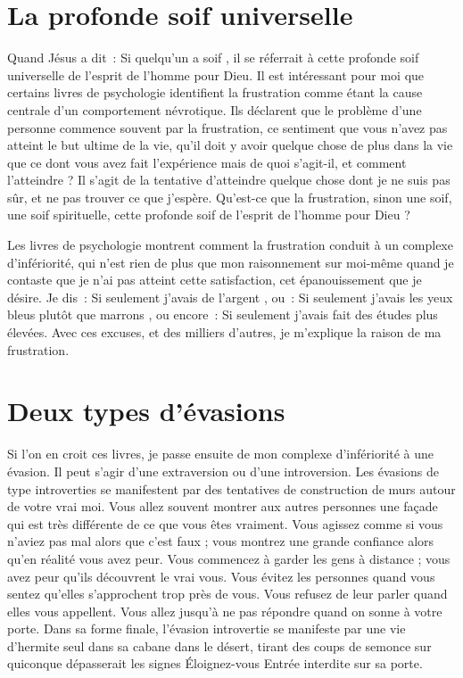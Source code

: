 \section*{La profonde soif universelle}

Quand Jésus a dit~: \og Si quelqu'un a soif \fg{}, il se réferrait
 à cette profonde soif universelle de l'esprit de l'homme pour Dieu.
 Il est intéressant pour moi que certains livres de psychologie
 identifient la frustration comme étant la cause centrale
 d'un comportement névrotique. Ils déclarent que le problème
 d'une personne commence souvent par la frustration,
 ce sentiment que vous n'avez pas atteint le but ultime de la vie,
 qu'il doit y avoir quelque chose de plus dans la vie que ce dont
 vous avez fait l'expérience \ocadr mais de quoi s'agit-il, et comment
 l'atteindre ?
 Il s'agit de la tentative d'atteindre quelque chose dont je ne suis pas sûr,
 et ne pas trouver ce que j'espère. Qu'est-ce que la frustration,
 sinon une soif, une soif spirituelle, cette profonde soif de l'esprit
 de l'homme pour Dieu ?

Les livres de psychologie montrent comment la frustration conduit
 à un complexe d'infériorité, qui n'est rien de plus que mon raisonnement
 sur moi-même quand je contaste que je n'ai pas atteint cette satisfaction,
 cet épanouissement que je désire. Je dis~:
 \og Si seulement j'avais de l'argent \fg{}, ou~:
 \og Si seulement j'avais les yeux bleus plutôt que marrons \fg{}, ou encore~:
 \og Si seulement j'avais fait des études plus élevées. \fg{}
 Avec ces excuses, et des milliers d'autres, je m'explique la raison
 de ma frustration.


\section*{Deux types d'évasions}

Si l'on en croit ces livres, je passe ensuite de mon complexe
 d'infériorité à une évasion.
 Il peut s'agir d'une extraversion ou d'une introversion.
 Les évasions de type introverties se manifestent par des tentatives
 de construction de murs autour de votre vrai moi.
 Vous allez souvent montrer aux autres personnes une façade qui est très
 différente de ce que vous êtes vraiment.
 Vous agissez comme si vous n'aviez pas mal alors que c'est faux ;
 vous montrez une grande confiance alors qu'en réalité vous avez peur.
 Vous commencez à garder les gens à distance ;
 vous avez peur qu'ils découvrent le vrai vous.
 Vous évitez les personnes quand vous sentez qu'elles s'approchent
 trop près de vous. Vous refusez de leur parler quand elles vous appellent.
 Vous allez jusqu'à ne pas répondre quand on sonne à votre porte.
 Dans sa forme finale, l'évasion introvertie se manifeste par une vie
 d'hermite seul dans sa cabane dans le désert, tirant des coups de semonce
 sur quiconque dépasserait les signes
 \og Éloignez-vous \ocadr Entrée interdite \fg{} sur sa porte.

